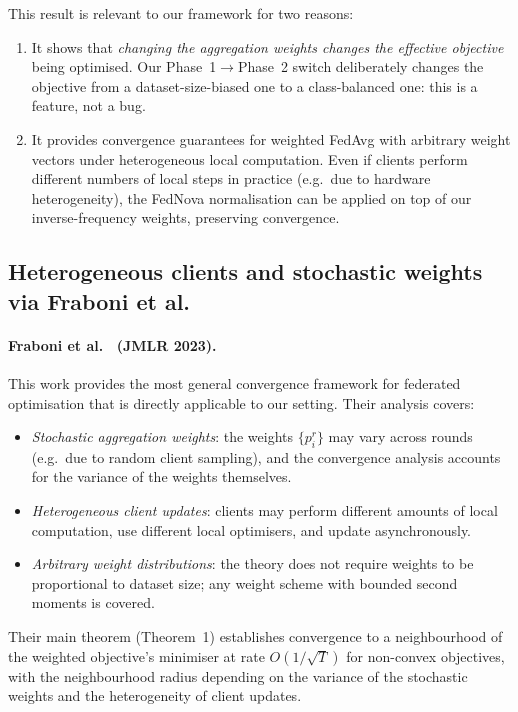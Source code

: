 \documentclass[runningheads]{llncs}
\begin{document}
This result is relevant to our framework for two reasons:
\begin{enumerate}
\item It shows that \emph{changing the aggregation weights changes the effective objective} being optimised.
Our Phase~1$\to$Phase~2 switch deliberately changes the objective from a dataset-size-biased one to a class-balanced one: this is a feature, not a bug.

\item It provides convergence guarantees for weighted FedAvg with arbitrary weight vectors under heterogeneous local computation.
Even if clients perform different numbers of local steps in practice (e.g.\ due to hardware heterogeneity), the FedNova normalisation can be applied on top of our inverse-frequency weights, preserving convergence.
\end{enumerate}

\subsection{Heterogeneous clients and stochastic weights via Fraboni et al.}\label{app:fraboni}

\paragraph{Fraboni et al.~\cite{ref_fraboni2023} (JMLR 2023).}
This work provides the most general convergence framework for federated optimisation that is directly applicable to our setting.
Their analysis covers:
\begin{itemize}
\item \emph{Stochastic aggregation weights}: the weights $\{p_i^r\}$ may vary across rounds (e.g.\ due to random client sampling), and the convergence analysis accounts for the variance of the weights themselves.
\item \emph{Heterogeneous client updates}: clients may perform different amounts of local computation, use different local optimisers, and update asynchronously.
\item \emph{Arbitrary weight distributions}: the theory does not require weights to be proportional to dataset size; any weight scheme with bounded second moments is covered.
\end{itemize}

Their main theorem (Theorem~1) establishes convergence to a neighbourhood of the weighted objective's minimiser at rate $O(1/\sqrt{T})$ for non-convex objectives, with the neighbourhood radius depending on the variance of the stochastic weights and the heterogeneity of client updates.
\end{document}
